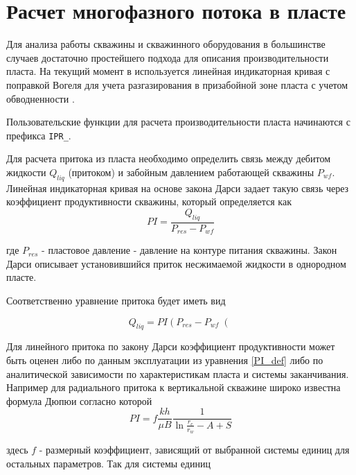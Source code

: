 
\section{Расчет многофазного потока в пласте}
Для анализа работы скважины и скважинного оборудования в большинстве случаев достаточно простейшего подхода для описания производительности пласта. На текущий момент в \unf{} используется линейная индикаторная кривая с поправкой Вогеля для учета разгазирования в призабойной зоне пласта с учетом обводненности \cite{KBrown_AL_methods_vol4}. 

Пользовательские функции для расчета производительности пласта начинаются с префикса  \texttt{IPR_}. 

Для расчета притока из пласта необходимо определить связь между дебитом жидкости $Q_{liq}$ (притоком) и забойным давлением работающей скважины $P_{wf}$.
Линейная индикаторная кривая на основе закона Дарси задает такую связь через коэффициент продуктивности скважины, который определяется как 
\begin{equation}\label{PI_def} 
 PI = \frac{Q_{liq}}{P_{res} - P_{wf}} 
\end{equation}

где $P_{res}$ - пластовое давление - давление на контуре питания скважины. Закон Дарси описывает установившийся приток несжимаемой жидкости в однородном пласте. 

Соответственно уравнение притока будет иметь вид

$$ Q_{liq} = PI \left( P_{res} - P_{wf} \right( $$

Для линейного притока по закону Дарси коэффициент продуктивности может быть оценен либо по данным эксплуатации из уравнения \ref{PI_def} либо по аналитической зависимости по характеристикам пласта и системы заканчивания. Например для радиального притока к вертикальной скважине широко известна формула Дюпюи согласно которой 
\begin{equation}\label{eq_Dupui} 
PI = f\frac{kh}{\mu B}\frac{1}{ \ln \frac{r_e}{r_w} -A + S }  
\end{equation}

здесь $f$ - размерный коэффициент, зависящий от выбранной системы единиц для остальных параметров. Так для системы единиц



